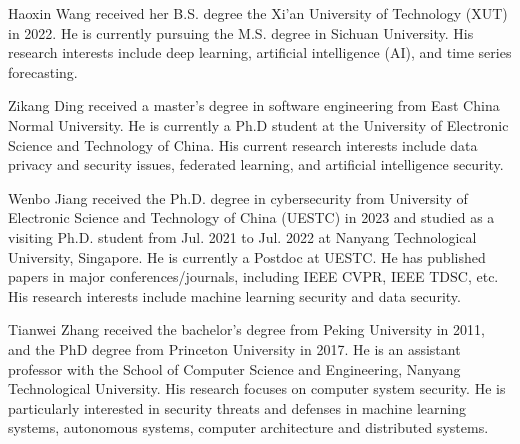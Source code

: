 \begin{IEEEbiography}{Haoxin Wang} received her B.S. degree the Xi’an University of Technology (XUT) in 2022. He is currently pursuing the M.S. degree in Sichuan University. His research interests include deep learning, artificial intelligence (AI), and time series forecasting.
\end{IEEEbiography}
\begin{IEEEbiography}{Zikang Ding} received a master's degree in software engineering from East China Normal University. He is currently a Ph.D student at the University of Electronic Science and Technology of China. His current research interests include data privacy and security issues, federated learning, and artificial intelligence security.
\end{IEEEbiography}
\begin{IEEEbiography}{Wenbo Jiang} received the Ph.D. degree in cybersecurity from University of Electronic Science and Technology of China (UESTC) in 2023 and studied as a visiting Ph.D. student from Jul. 2021 to Jul. 2022 at Nanyang Technological University, Singapore. He is currently a Postdoc at UESTC. He has published papers in major conferences/journals, including IEEE CVPR, IEEE TDSC, etc. His research interests include machine learning security and data security.
\end{IEEEbiography}
\begin{IEEEbiography}{Tianwei Zhang} received the bachelor’s degree from Peking University in 2011, and the PhD degree from Princeton University in 2017. He is an assistant professor with the School of Computer Science and Engineering, Nanyang Technological University. His research focuses on computer system security. He is particularly interested in security threats and defenses in machine learning systems, autonomous systems, computer architecture and distributed systems.
\end{IEEEbiography}
